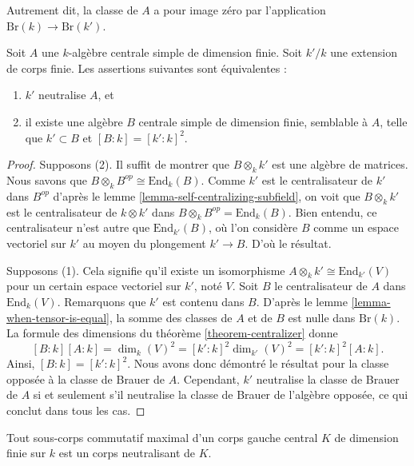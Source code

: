 \noindent
Autrement dit, la classe de $A$ a pour image zéro
par l'application $\text{Br}(k) \to \text{Br}(k')$.

\begin{theorem}
\label{theorem-splitting}
Soit $A$ une $k$-algèbre centrale simple de dimension finie.
Soit $k'/k$ une extension de corps finie.
Les assertions suivantes sont équivalentes :
\begin{enumerate}
\item $k'$ neutralise $A$, et
\item il existe une algèbre $B$ centrale simple de dimension finie, semblable à $A$,
telle que $k' \subset B$ et $[B : k] = [k' : k]^2$.
\end{enumerate}
\end{theorem}

\begin{proof}
Supposons (2). Il suffit de montrer que $B \otimes_k k'$ est une algèbre de
matrices. Nous savons que $B \otimes_k B^{op} \cong \text{End}_k(B)$.
Comme $k'$ est le centralisateur de $k'$ dans $B^{op}$ d'après le
lemme \ref{lemma-self-centralizing-subfield},
on voit que $B \otimes_k k'$ est le centralisateur de $k \otimes k'$
dans $B \otimes_k B^{op} = \text{End}_k(B)$. Bien entendu, ce centralisateur
n'est autre que $\text{End}_{k'}(B)$, où l'on considère $B$ comme un espace vectoriel sur $k'$
au moyen du plongement $k' \to B$. D'où le résultat.

\medskip\noindent
Supposons (1). Cela signifie qu'il existe un isomorphisme
$A \otimes_k k' \cong \text{End}_{k'}(V)$ pour un certain espace vectoriel sur $k'$, noté $V$.
Soit $B$ le centralisateur de $A$ dans $\text{End}_k(V)$. Remarquons que
$k'$ est contenu dans $B$. D'après le
lemme \ref{lemma-when-tensor-is-equal},
la somme des classes de $A$ et de $B$ est nulle dans $\text{Br}(k)$.
La formule des dimensions du
théorème \ref{theorem-centralizer}
donne
$$
[B : k] [A : k] =
\dim_k(V)^2 =
[k' : k]^2 \dim_{k'}(V)^2 =
[k' : k]^2 [A : k].
$$
Ainsi, $[B : k] = [k' : k]^2$. Nous avons donc démontré le résultat pour la
classe opposée à la classe de Brauer de $A$. Cependant, $k'$ neutralise la classe de Brauer
de $A$ si et seulement s'il neutralise
la classe de Brauer de l'algèbre opposée, ce qui conclut dans tous les cas.
\end{proof}

\begin{lemma}
\label{lemma-maximal-subfield-splits}
Tout sous-corps commutatif maximal d'un corps gauche central $K$ de dimension finie sur $k$ est
un corps neutralisant de $K$.
\end{lemma}

